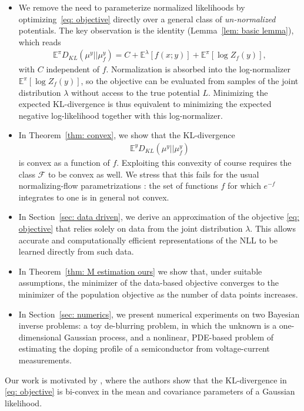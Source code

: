 \documentclass{amsart}
\theoremstyle{definition}
\newcommand{\E}{{\mathbb E}}
\newcommand{\F}{\mathcal{F}}
\newcommand{\KL}[2]{D_{KL}\left(#1 || #2\right)}
\begin{document}
\begin{itemize}
    \item We remove the need to parameterize normalized likelihoods by optimizing~\eqref{eq: objective} directly over a general class of \emph{un-normalized} potentials. The key observation is the identity (Lemma~\ref{lem: basic lemma}), which reads
    \begin{eqnarray*}
     \E^\pi\KL{\mu^y}{\mu^y_f} =  C + \E^\lambda[f(x;y)] + \E^\pi[\log Z_f(y)],
    \end{eqnarray*}
with $C$ independent of $f$. Normalization is absorbed into the log-normalizer $\E^\pi[\log Z_f(y)]$, so the objective can be evaluated from samples of the joint distribution $\lambda$ without access to the true potential $L$. Minimizing the expected KL-divergence is thus equivalent to minimizing the expected negative log-likelihood together with this log-normalizer.
    \item In Theorem~\ref{thm: convex}, we show that the KL-divergence 
    \begin{eqnarray*}
        \E^{y}\KL{\mu^y}{\mu^y_f}
    \end{eqnarray*}
    is convex as a function of $f$. Exploiting this convexity of course requires the class $\F$ to be convex as well. We stress that this fails for the usual normalizing-flow parametrizations \cite{papamakarios2019sequantialneural, rothfuss2019conditional}: the set of functions $f$ for which $e^{-f}$ integrates to one is in general not convex.
    \item In Section~\ref{sec: data driven}, we derive an approximation of the objective \eqref{eq: objective} that relies solely on data from the joint distribution $\lambda$. This allows accurate and computationally efficient representations of the NLL to be learned directly from such data.
    \item In Theorem~\ref{thm: M estimation ours} we show that, under suitable assumptions, the minimizer of the data-based objective converges to the minimizer of the population objective as the number of data points increases.
    \item In Section~\ref{sec: numerics}, we present numerical experiments on two Bayesian inverse problems: a toy de-blurring problem, in which the unknown is a one-dimensional Gaussian process, and a nonlinear, PDE-based problem of estimating the doping profile of a semiconductor from voltage-current measurements.
\end{itemize}
Our work is motivated by \cite{Helin2025OAE}, where the authors show that the KL-divergence in \eqref{eq: objective} is bi-convex in the mean and covariance parameters of a Gaussian likelihood.
\end{document}
